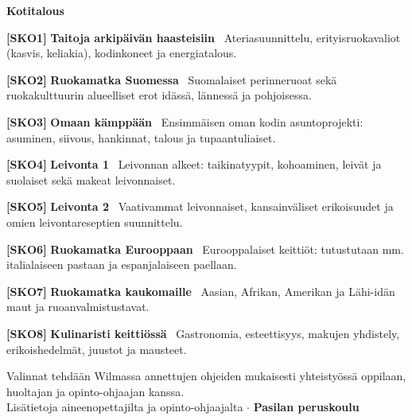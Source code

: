 \documentclass[10pt,a4paper]{article}
\newcommand{\mysubsection}[1]{%
  \vspace{3pt}%
  {\noindent\normalsize\bfseries\color{accentteal} #1}\par
  \vspace{1pt}%
}
\newcommand{\courseitem}[3]{%
  \noindent\textbf{\color{badgecode}[#1]} \textbf{#2} \textendash\ {\color{textdark}#3}\par\vspace{1.5pt}%
}
\begin{document}
\mysubsection{Kotitalous}
\courseitem{SKO1}{Taitoja arkipäivän haasteisiin}{Ateriasuunnittelu, erityisruokavaliot (kasvis, keliakia), kodinkoneet ja energiatalous.}
\courseitem{SKO2}{Ruokamatka Suomessa}{Suomalaiset perinneruoat sekä ruokakulttuurin alueelliset erot idässä, lännessä ja pohjoisessa.}
\courseitem{SKO3}{Omaan kämppään}{Ensimmäisen oman kodin asuntoprojekti: asuminen, siivous, hankinnat, talous ja tupaantuliaiset.}
\courseitem{SKO4}{Leivonta 1}{Leivonnan alkeet: taikinatyypit, kohoaminen, leivät ja suolaiset sekä makeat leivonnaiset.}
\courseitem{SKO5}{Leivonta 2}{Vaativammat leivonnaiset, kansainväliset erikoisuudet ja omien leivontareseptien suunnittelu.}
\courseitem{SKO6}{Ruokamatka Eurooppaan}{Eurooppalaiset keittiöt: tutustutaan mm. italialaiseen pastaan ja espanjalaiseen paellaan.}
\courseitem{SKO7}{Ruokamatka kaukomaille}{Aasian, Afrikan, Amerikan ja Lähi-idän maut ja ruoanvalmistustavat.}
\courseitem{SKO8}{Kulinaristi keittiössä}{Gastronomia, esteettisyys, makujen yhdistely, erikoishedelmät, juustot ja mausteet.}

\vspace{6pt}
\begin{center}
  \footnotesize\color{textgray}
  Valinnat tehdään Wilmassa annettujen ohjeiden mukaisesti yhteistyössä oppilaan, huoltajan ja opinto-ohjaajan kanssa.\\[1pt]
  Lisätietoja aineenopettajilta ja opinto-ohjaajalta $\cdot$ \textbf{Pasilan peruskoulu}
\end{center}
\end{document}

